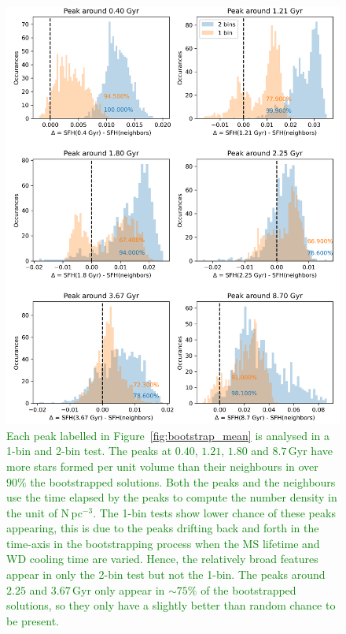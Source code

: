 \documentclass[fleqn,usenatbib]{mnras}
\begin{document}
\begin{figure}
    \centering
    \includegraphics[width=\columnwidth]{figures/fig_07_sfh_peak_significance.png}
    \caption{
    \textcolor{green}{
    Each peak labelled in Figure~\ref{fig:bootstrap_mean} is analysed in a
    1-bin and 2-bin test. The peaks at $0.40$, $1.21$, $1.80$ and $8.7$\,Gyr have
    more stars formed per unit volume than their neighbours in over $90\%$ the
    bootstrapped solutions. Both the peaks and the neighbours use the time
    elapsed by the peaks to compute the number density in the unit of
    N\,pc$^{-3}$. The 1-bin tests show lower chance of these peaks appearing,
    this is due to the peaks drifting back and forth in the time-axis in the
    bootstrapping process when the MS lifetime and WD cooling time are varied.
    Hence, the relatively broad features appear in only the 2-bin test but not
    the 1-bin. The peaks around $2.25$ and $3.67$\,Gyr only appear in
    $\sim$$75\%$ of the bootstrapped solutions, so they only have a slightly
    better than random chance to be present.
    }
    }
    \label{fig:full_sample_peaks}
\end{figure}
\end{document}
